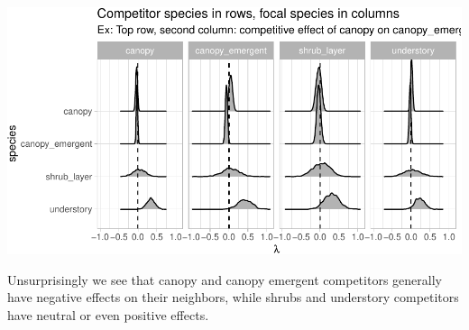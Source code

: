 \documentclass[12pt]{article}
\newenvironment{Shaded}{\begin{snugshade}}{\end{snugshade}}
\newcommand{\DataTypeTok}[1]{\textcolor[rgb]{0.13,0.29,0.53}{#1}}
\newcommand{\KeywordTok}[1]{\textcolor[rgb]{0.13,0.29,0.53}{\textbf{#1}}}
\newcommand{\NormalTok}[1]{#1}
\newcommand{\OperatorTok}[1]{\textcolor[rgb]{0.81,0.36,0.00}{\textbf{#1}}}
\newcommand{\OtherTok}[1]{\textcolor[rgb]{0.56,0.35,0.01}{#1}}
\newcommand{\StringTok}[1]{\textcolor[rgb]{0.31,0.60,0.02}{#1}}
\begin{document}
\begin{Shaded}
\end{Shaded}

\begin{center}\includegraphics[width=1\linewidth]{Figures/can-pos-comp-1} \end{center}

Unsurprisingly we see that canopy and canopy emergent competitors
generally have negative effects on their neighbors, while shrubs and
understory competitors have neutral or even positive effects.



\end{document}
